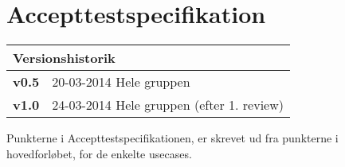 \chapter{Accepttestspecifikation}

\begin{table}[!htbp] \centering
\begin{tabular}{|p{2cm}|p{8cm}|}
	\hline
		\multicolumn{2}{|l|}{Versionshistorik} \\ \hline
		\textbf{v0.5} &20-03-2014 Hele gruppen \\ \hline
		\textbf{v1.0} &24-03-2014 Hele gruppen (efter 1. review) \\ \hline
	\end{tabular}
\end{table}

Punkterne i Accepttestspecifikationen, er skrevet ud fra punkterne i hovedforløbet, for de enkelte usecases.
























